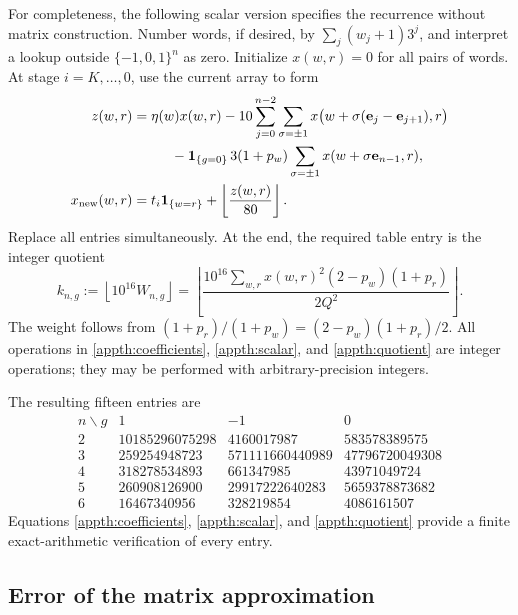 \documentclass[11pt]{article}
\theoremstyle{remark}
\numberwithin{equation}{section}
\begin{document}
For completeness, the following scalar version specifies the recurrence
without matrix construction. Number words, if desired, by
$\sum_j(w_j+1)3^j$, and interpret a lookup outside $\{-1,0,1\}^n$ as zero.
Initialize $x(w,r)=0$ for all pairs of words. At stage $i=K,\ldots,0$, use
the current array to form
\begin{align}
 z(w,r)={}&\eta(w)x(w,r)
       -10\sum_{j=0}^{n-2}\sum_{\sigma=\pm1}
             x\bigl(w+\sigma(\mathbf e_j-\mathbf e_{j+1}),r\bigr)
       \nonumber\\
 &\hspace{5mm}
       -\mathbf1_{\{g=0\}}\,3(1+p_w)
             \sum_{\sigma=\pm1}x(w+\sigma\mathbf e_{n-1},r),
       \label{appth:scalar}\\
 x_{\rm new}(w,r)={}&t_i\mathbf1_{\{w=r\}}
                    +\left\lfloor\frac{z(w,r)}{80}\right\rfloor.
       \nonumber
\end{align}
Replace all entries simultaneously. At the end, the required table entry is
the integer quotient
\begin{equation}\label{appth:quotient}
 k_{n,g}:=\left\lfloor10^{16}W_{n,g}\right\rfloor
 =\left\lfloor
 \frac{10^{16}\displaystyle\sum_{w,r}
                 x(w,r)^2(2-p_w)(1+p_r)}{2Q^2}
 \right\rfloor.
\end{equation}
The weight follows from
$(1+p_r)/(1+p_w)=(2-p_w)(1+p_r)/2$.
All operations in \eqref{appth:coefficients}, \eqref{appth:scalar}, and
\eqref{appth:quotient} are integer operations; they may be performed with
arbitrary-precision integers.

The resulting fifteen entries are
\begin{equation}\label{appth:integer-table}
\begin{array}{c|rrr}
 n\backslash g&1&-1&0\\\hline
 2&10185296075298&4160017987&583578389575\\
 3&259254948723&571111660440989&47796720049308\\
 4&318278534893&661347985&43971049724\\
 5&260908126900&29917222640283&5659378873682\\
 6&16467340956&328219854&4086161507
\end{array}
\end{equation}
Equations \eqref{appth:coefficients}, \eqref{appth:scalar}, and
\eqref{appth:quotient} provide a finite exact-arithmetic verification of
every entry.

\subsection{Error of the matrix approximation}
\end{document}
